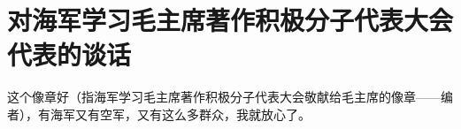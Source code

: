 \section[对海军学习毛主席著作积极分子代表大会代表的谈话（一九六七年十一月十九日）]{对海军学习毛主席著作积极分子代表大会代表的谈话}


这个像章好（指海军学习毛主席著作积极分子代表大会敬献给毛主席的像章——编者），有海军又有空军，又有这么多群众，我就放心了。


